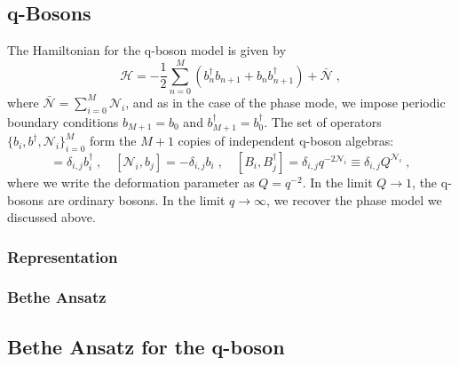 \documentclass[a4paper,11pt]{amsart}
\begin{document}

\subsection{q-Bosons}
The Hamiltonian for the q-boson model is
given by
\begin{equation}
  \mathcal{H} = -\frac{1}{2} \sum_{n=0}^M
  \left(b_n^\dagger b_{n+1} + b_n b_{n+1}^\dagger \right) + \bar{\mathcal{N}}\; ,
\end{equation}
where \(\bar{\mathcal{N}} = \sum_{i=0}^M \mathcal{N}_i\), and as in
the case of the phase mode, we impose periodic boundary conditions
\(b_{M+1} = b_0\) and \(b_{M+1}^\dagger = b_0^\dagger\). The set of
operators \(\{b_i, b^\dagger,\mathcal{N}_i\}_{i=0}^M\) form the
\(M+1\) copies of independent q-boson algebras:
\begin{equation}
[\mathcal{N}_i, b_j^\dagger]=\delta_{i,j} b_i^\dagger\; , \quad 
[\mathcal{N}_i, b_j]=-\delta_{i,j}b_i\; , \quad
[B_i, B_j^\dagger]= \delta_{i,j} q^{-2\mathcal{N}_i}  \equiv \delta_{i,j} Q^{\mathcal{N}_i}\; , 
\end{equation}
where we write the deformation parameter as \(Q = q^{-2}\). 
In the limit \(Q\to 1\), the q-bosons are ordinary bosons. 
In the limit \(q\to \infty\), we recover the phase model we discussed above. 

\subsubsection{Representation}

\subsubsection{Bethe Ansatz}


\subsection{Bethe Ansatz for the q-boson}
\end{document}
